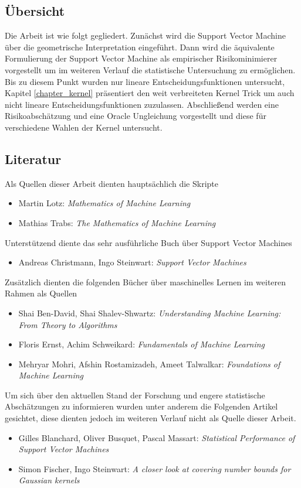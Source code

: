 \documentclass{article}
\theoremstyle{plain}
\theoremstyle{definition}
\begin{document}
\subsection{Übersicht}
    Die Arbeit ist wie folgt gegliedert. Zunächst wird die Support Vector Machine über die geometrische Interpretation eingeführt. Dann wird die äquivalente Formulierung der Support Vector Machine als empirischer Risikominimierer vorgestellt um im weiteren Verlauf die statistische Untersuchung zu ermöglichen. Bis zu diesem Punkt wurden nur lineare Entscheidungsfunktionen untersucht, Kapitel \ref{chapter_kernel} präsentiert den weit verbreiteten Kernel Trick um auch nicht lineare Entscheidungsfunktionen zuzulassen. Abschließend werden eine Risikoabschätzung und eine Oracle Ungleichung vorgestellt und diese für verschiedene Wahlen der Kernel untersucht.
    
\subsection{Literatur}
    Als Quellen dieser Arbeit dienten hauptsächlich die Skripte
    \begin{itemize}
        \item[\cite{lotz}] Martin Lotz: \textit{Mathematics of Machine Learning}
        \item [\cite{trabs}] Mathias Trabs: \textit{The Mathematics of Machine Learning}
    \end{itemize}
    Unterstützend diente das sehr ausführliche Buch über Support Vector Machines
    \begin{itemize}
        \item[\cite{svm}] Andreas Christmann, Ingo Steinwart: \textit{Support Vector Machines}
    \end{itemize}
    Zusätzlich dienten die folgenden Bücher über maschinelles Lernen im weiteren Rahmen als Quellen
    \begin{itemize}
        \item[\cite{understanding}] Shai Ben-David, Shai Shalev-Shwartz: \textit{Understanding Machine Learning: From Theory to Algorithms}
        \item[\cite{fundamentals}] Floris Ernst, Achim Schweikard: \textit{Fundamentals of Machine Learning}
        \item[\cite{foundations}] Mehryar Mohri, Afshin Rostamizadeh, Ameet Talwalkar: \textit{Foundations of Machine Learning}
    \end{itemize}
    
    Um sich über den aktuellen Stand der Forschung und engere statistische Abschätzungen zu informieren wurden unter anderem die Folgenden Artikel gesichtet, diese dienten jedoch im weiteren Verlauf nicht als Quelle dieser Arbeit.
    \begin{itemize}
        \item[\cite{blanchard_statistical_2008}] Gilles Blanchard, Oliver Busquet, Pascal Massart: \textit{Statistical Performance of Support Vector Machines}
        \item[\cite{STEINWART2021101513}] Simon Fischer, Ingo Steinwart: \textit{A closer look at covering number bounds for Gaussian kernels}
    \end{itemize}
    
\end{document}
